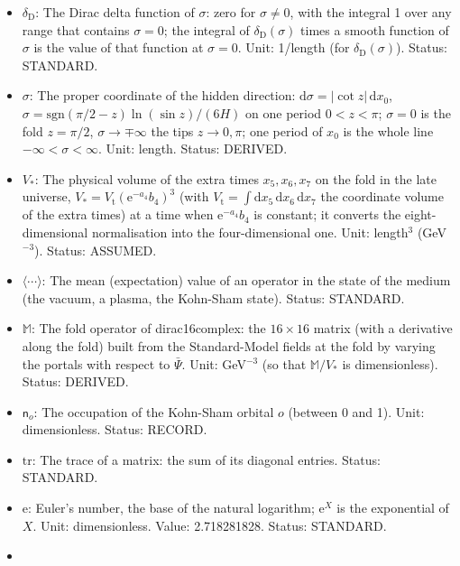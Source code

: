 \documentclass[
  10pt,
]{article}
\begin{document}
\begin{itemize}
  runs over the orbitals or the modes. Status: STANDARD.
\item
  \(\delta_{\mathrm{D}}\): The Dirac delta function of \(\sigma\): zero
  for \(\sigma \ne 0\), with the integral 1 over any range that contains
  \(\sigma = 0\); the integral of \(\delta_{\mathrm{D}}(\sigma)\) times
  a smooth function of \(\sigma\) is the value of that function at
  \(\sigma = 0\). Unit: 1/length (for \(\delta_{\mathrm{D}}(\sigma)\)).
  Status: STANDARD.
\item
  \(\sigma\): The proper coordinate of the hidden direction:
  \(\mathrm{d}\sigma = \lvert\cot z\rvert\,\mathrm{d}x_0\),
  \(\sigma = \mathrm{sgn}(\pi/2 - z)\ln(\sin z)/(6H)\) on one period
  \(0 < z < \pi\); \(\sigma = 0\) is the fold \(z = \pi/2\),
  \(\sigma \to \mp\infty\) the tips \(z \to 0, \pi\); one period of
  \(x_0\) is the whole line \(-\infty < \sigma < \infty\). Unit: length.
  Status: DERIVED.
\item
  \(V_*\): The physical volume of the extra times \(x_5, x_6, x_7\) on
  the fold in the late universe,
  \(V_* = V_{\mathrm{t}}(\mathrm{e}^{-a_4}b_4)^3\) (with
  \(V_{\mathrm{t}} = \int\mathrm{d}x_5\,\mathrm{d}x_6\,\mathrm{d}x_7\)
  the coordinate volume of the extra times) at a time when
  \(\mathrm{e}^{-a_4}b_4\) is constant; it converts the
  eight-dimensional normalisation into the four-dimensional one. Unit:
  length\(^3\) (GeV\(^{-3}\)). Status: ASSUMED.
\item
  \(\langle\cdots\rangle\): The mean (expectation) value of an operator
  in the state of the medium (the vacuum, a plasma, the Kohn-Sham
  state). Status: STANDARD.
\item
  \(\mathbb{M}\): The fold operator of dirac16complex: the
  \(16 \times 16\) matrix (with a derivative along the fold) built from
  the Standard-Model fields at the fold by varying the portals with
  respect to \(\bar\Psi\). Unit: GeV\(^{-3}\) (so that
  \(\mathbb{M}/V_*\) is dimensionless). Status: DERIVED.
\item
  \(\mathsf{n}_o\): The occupation of the Kohn-Sham orbital \(o\)
  (between 0 and 1). Unit: dimensionless. Status: RECORD.
\item
  \(\mathrm{tr}\): The trace of a matrix: the sum of its diagonal
  entries. Status: STANDARD.
\item
  \(\mathrm{e}\): Euler's number, the base of the natural logarithm;
  \(\mathrm{e}^{X}\) is the exponential of \(X\). Unit: dimensionless.
  Value: 2.718281828. Status: STANDARD.
\item

\end{itemize}
\end{document}
